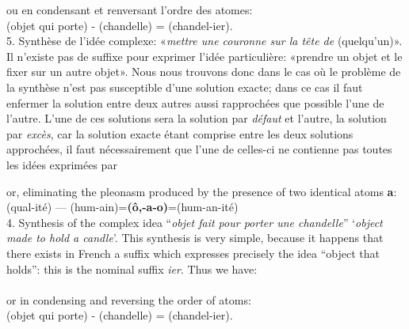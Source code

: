 \begin{sloppypar}
{  \noindent
  ou en condensant et renversant l’ordre des atomes:\\[1ex]

  \noindent
  {\small
    (objet qui porte) - (chandelle) = (chandel-ier).}\\[1ex]

  5. Synthèse de l’idée complexe: «\emph{mettre une couronne sur la
    tête de} (quelqu'un)». Il n’existe pas de suffixe pour exprimer
  l'idée particulière: «prendre un objet et le fixer sur un autre
  objet». Nous nous trouvons donc dans le cas où le problème de la
  synthèse n’est pas susceptible d’une solution exacte; dans ce cas il
  faut enfermer la solution entre deux autres aussi rapprochées que
  possible l’une de l’autre. L’une de ces solutions sera la solution
  par \emph{défaut} et l’autre, la solution par \emph{excès}, car la
  solution exacte étant comprise entre les deux solutions approchées,
  il faut nécessairement que l’une de celles-ci ne contienne pas
  toutes les idées exprimées par

}
%
{\noindent
  or, eliminating the pleonasm produced by the presence of two
  identical atoms \textbf{a}:\\[1ex]

  \noindent
  {\small
    (qual-ité) — (hum-ain)=\textbf{(ô,-a-o)}=(hum-an-ité)}\\[1ex]

  4. Synthesis of the complex idea ``\emph{objet fait pour porter une
    chandelle}'' `\emph{object made to hold a candle}'. This synthesis
  is very simple, because it happens that there exists in French a
  suffix which expresses precisely the idea ``object that holds'':
  this is the nominal suffix \emph{ier}. Thus we have:\\[1ex]

  \noindent
  {\setlength{\tabcolsep}{0pt} \small
    }\\[1ex]

  \noindent
  or in condensing and reversing the order of atoms:\\[1ex]

  \noindent
  {\small
    (objet qui porte) - (chandelle) = (chandel-ier).}\\[1ex]

}
\end{sloppypar}
